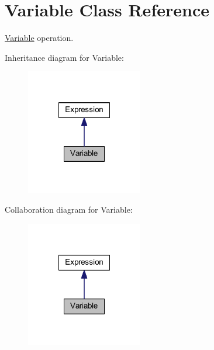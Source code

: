 \hypertarget{class_variable}{\section{Variable Class Reference}
\label{class_variable}
}


\hyperlink{class_variable}{Variable} operation.  




Inheritance diagram for Variable\-:\nopagebreak
\begin{figure}[H]
\begin{center}
\leavevmode
\includegraphics[width=144pt]{class_variable__inherit__graph}
\end{center}
\end{figure}


Collaboration diagram for Variable\-:\nopagebreak
\begin{figure}[H]
\begin{center}
\leavevmode
\includegraphics[width=144pt]{class_variable__coll__graph}
\end{center}
\end{figure}
